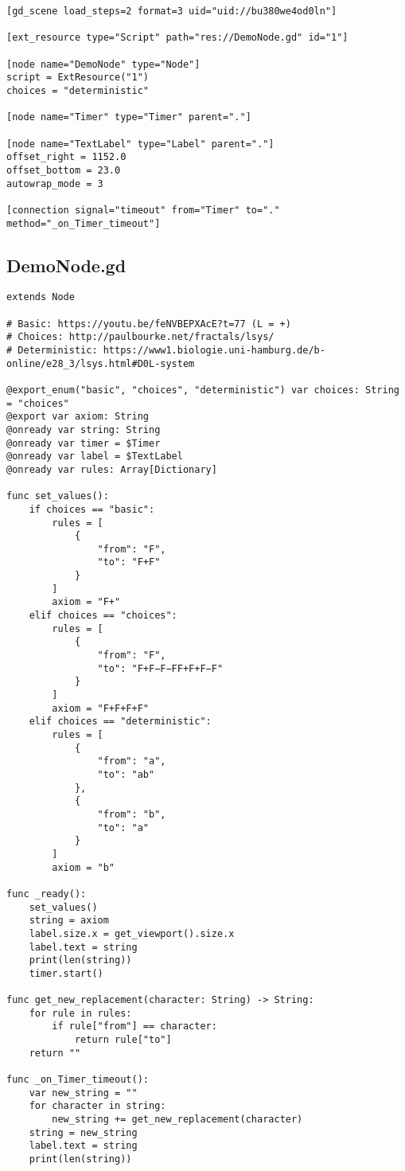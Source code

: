 \begin{lstlisting}
[gd_scene load_steps=2 format=3 uid="uid://bu380we4od0ln"]

[ext_resource type="Script" path="res://DemoNode.gd" id="1"]

[node name="DemoNode" type="Node"]
script = ExtResource("1")
choices = "deterministic"

[node name="Timer" type="Timer" parent="."]

[node name="TextLabel" type="Label" parent="."]
offset_right = 1152.0
offset_bottom = 23.0
autowrap_mode = 3

[connection signal="timeout" from="Timer" to="." method="_on_Timer_timeout"]
\end{lstlisting}

\subsection{DemoNode.gd}

\begin{lstlisting}
extends Node

# Basic: https://youtu.be/feNVBEPXAcE?t=77 (L = +)
# Choices: http://paulbourke.net/fractals/lsys/
# Deterministic: https://www1.biologie.uni-hamburg.de/b-online/e28_3/lsys.html#D0L-system

@export_enum("basic", "choices", "deterministic") var choices: String = "choices"
@export var axiom: String
@onready var string: String
@onready var timer = $Timer
@onready var label = $TextLabel
@onready var rules: Array[Dictionary]

func set_values():
	if choices == "basic":
		rules = [
			{
				"from": "F",
				"to": "F+F"
			}
		]
		axiom = "F+"
	elif choices == "choices":
		rules = [
			{
				"from": "F",
				"to": "F+F−F−FF+F+F−F"
			}
		]
		axiom = "F+F+F+F"
	elif choices == "deterministic":
		rules = [
			{
				"from": "a",
				"to": "ab"
			},
			{
				"from": "b",
				"to": "a"
			}
		]
		axiom = "b"

func _ready():
	set_values()
	string = axiom
	label.size.x = get_viewport().size.x
	label.text = string
	print(len(string))
	timer.start()

func get_new_replacement(character: String) -> String:
	for rule in rules:
		if rule["from"] == character:
			return rule["to"]
	return ""

func _on_Timer_timeout():
	var new_string = ""
	for character in string:
		new_string += get_new_replacement(character)
	string = new_string
	label.text = string
	print(len(string))
\end{lstlisting}

